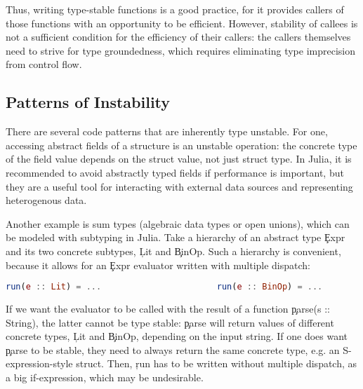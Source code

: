 Thus, writing type-stable functions is a good practice, for it provides
callers of those functions with an opportunity to be efficient.
However, stability of callees is not a sufficient condition for the efficiency
of their callers: the callers themselves need to strive for type groundedness,
which requires eliminating type imprecision from control flow.

\subsection{Patterns of Instability}

There are several code patterns
that are inherently type unstable. For one, accessing abstract fields of
a structure is an unstable operation:
the concrete type of the field value depends on the struct value,
not just struct type. In Julia, it is recommended to avoid abstractly typed
fields if performance is important, %
but they are a useful tool for interacting with external data sources
and representing heterogenous data.

Another example is sum types (algebraic data types or open unions), which can be
modeled with subtyping in Julia. Take a hierarchy of an abstract type \c{Expr}
and its two concrete subtypes, \c{Lit} and \c{BinOp}.
Such a hierarchy is convenient, because
it allows for an \c{Expr} evaluator written with multiple dispatch:
\begin{lstlisting}[basicstyle=\footnotesize\ttfamily,language=julia]
run(e :: Lit) = ...                       run(e :: BinOp) = ...
\end{lstlisting}
If we want the evaluator to be called with the result of a function
\c{parse(s :: String)}, the latter cannot be type stable: \c{parse} will return
values of different concrete types, \c{Lit} and \c{BinOp}, depending on the
input string.
If one does want \c{parse} to be stable, they need to always
return the same concrete type, e.g. an S-expression-style struct. Then, \c{run}
has to be written without multiple dispatch, as a big if-expression, which may
be undesirable.
